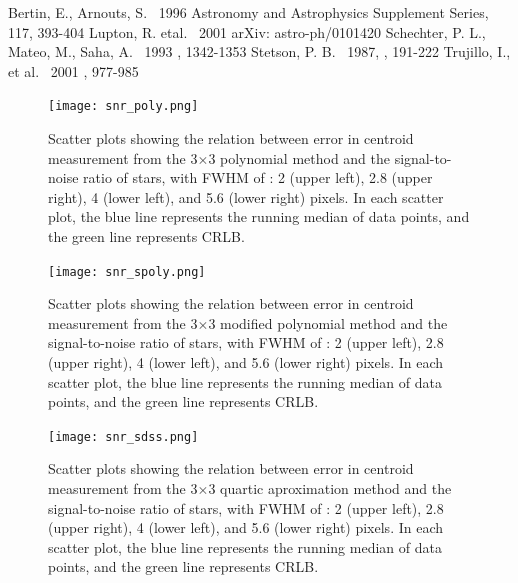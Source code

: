 \documentclass[12pt, preprint]{aastex}
\begin{document}
\begin{thebibliography}{70}

 Bertin, E., Arnouts, S. \ 1996  Astronomy and Astrophysics Supplement Series, 117, 393-404
 Lupton, R. etal. \ 2001  arXiv: astro-ph/0101420
 Schechter, P. L., Mateo, M., Saha, A. \ 1993 \pasp, 1342-1353
 Stetson, P. B. \ 1987, \pasp, 191-222
 Trujillo, I., et al. \ 2001 \mnras, 977-985

\end{thebibliography}

\clearpage


\begin{figure}[!htb]
  \texttt{[image: snr\_poly.png]}
\endminipage
\caption{Scatter plots showing the relation between error in centroid measurement from the 3$\times$3 polynomial method and the signal-to-noise ratio of stars, with FWHM of : 2 (upper left), 2.8 (upper right), 4 (lower left), and 5.6 (lower right) pixels. In each scatter plot, the blue line represents the running median of data points, and the green line represents CRLB.}\label{1}
\end{figure}

\begin{figure}[!htb]
  \texttt{[image: snr\_spoly.png]}
\endminipage
\caption{Scatter plots showing the relation between error in centroid measurement from the 3$\times$3 modified polynomial method and the signal-to-noise ratio of stars, with FWHM of : 2 (upper left), 2.8 (upper right), 4 (lower left), and 5.6 (lower right) pixels. In each scatter plot, the blue line represents the running median of data points, and the green line represents CRLB.}\label{2}
\end{figure}

\begin{figure}[!htb]
  \texttt{[image: snr\_sdss.png]}
\endminipage
\caption{Scatter plots showing the relation between error in centroid measurement from the 3$\times$3 quartic aproximation method and the signal-to-noise ratio of stars, with FWHM of : 2 (upper left), 2.8 (upper right), 4 (lower left), and 5.6 (lower right) pixels. In each scatter plot, the blue line represents the running median of data points, and the green line represents CRLB.}\label{3}
\end{figure}
\end{document}
